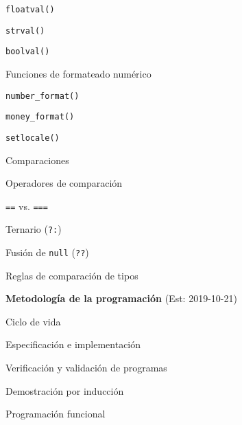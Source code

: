 \begin{longenum}
\begin{longenum}
\begin{longenum}
\begin{longenum}
\begin{longenum}
                    \item \texttt{floatval()}
                    \item \texttt{strval()}
                    \item \texttt{boolval()}
                \end{longenum}
                \item Funciones de formateado numérico
                \begin{longenum}
                    \item \texttt{number\_format()}
                    \item \texttt{money\_format()}
                    \begin{longenum}
                        \item \texttt{setlocale()}
                    \end{longenum}
                \end{longenum}
            \end{longenum}
            \item Comparaciones
            \begin{longenum}
                \item Operadores de comparación
                \item \texttt{==} vs. \texttt{===}
                \item Ternario (\texttt{?:})
                \item Fusión de \texttt{null} (\texttt{??})
                \item Reglas de comparación de tipos
            \end{longenum}
        \end{longenum}
    \end{longenum}
    \item \textbf{Metodología de la programación}  (Est: 2019-10-21)
    \begin{longenum}
        \item Ciclo de vida
        \item Especificación e implementación
        \item Verificación y validación de programas
        \begin{longenum}
            \item Demostración por inducción
        \end{longenum}
        \item Programación funcional
        \begin{longenum}

\end{longenum}
\end{longenum}
\end{longenum}
